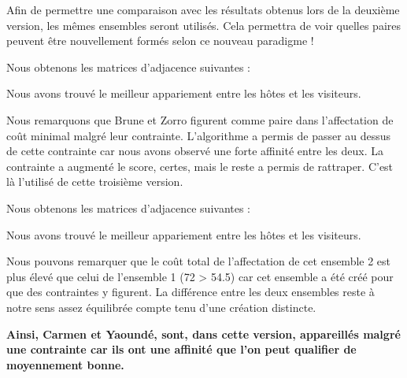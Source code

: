 \documentclass{mytex}
\begin{document}
Afin de permettre une comparaison avec les résultats obtenus lors de la deuxième version, les mêmes ensembles seront utilisés.
Cela permettra de voir quelles paires peuvent être nouvellement formés selon ce nouveau paradigme !

Nous obtenons les matrices d'adjacence suivantes :



Nous avons trouvé le meilleur appariement entre les hôtes et les visiteurs.



Nous remarquons que Brune et Zorro figurent comme paire dans l'affectation de coût minimal malgré leur contrainte.
L'algorithme a permis de passer au dessus de cette contrainte car nous avons observé une forte affinité entre les deux. La contrainte a augmenté le score, certes, mais le reste a permis de rattraper.
C'est là l'utilisé de cette troisième version.


Nous obtenons les matrices d'adjacence suivantes : 



Nous avons trouvé le meilleur appariement entre les hôtes et les visiteurs.


Nous pouvons remarquer que le coût total de l'affectation de cet ensemble 2 est plus élevé que celui de l'ensemble 1 (72 > 54.5) car cet ensemble a été créé pour que des contraintes y figurent. La différence entre les deux ensembles reste à notre sens assez équilibrée compte tenu d'une création distincte.

\textbf{Ainsi, Carmen et Yaoundé, sont, dans cette version, appareillés malgré une contrainte car ils ont une affinité que l'on peut qualifier de moyennement bonne.}

\end{document}

